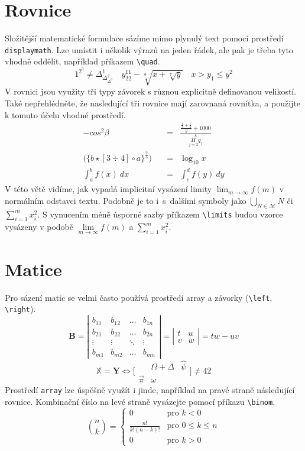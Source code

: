 \documentclass[a4paper, twocolumn, 11pt]{article}
\begin{document}
\section{Rovnice}
Složitější matematické formulace sázíme mimo plynulý text pomocí prostředí \texttt{displaymath}. Lze umístit i několik výrazů na jeden řádek, ale pak je třeba tyto vhodně oddělit, například příkazem \verb|\quad|. 
$$
1^{2^3} \neq \Delta_{\Delta_{\Delta^3}^2}^1 \quad y_{22}^{11}-\sqrt[9]{x+\sqrt[7]{y}} \quad x>y_1\leq y^2
$$
V rovnici jsou využity tři typy závorek s různou explicitně definovanou velikostí. Také nepřehlédněte, že nasledující tři rovnice mají zarovnaná rovnítka, a použijte k tomuto účelu vhodné prostředí. 
\begin{eqnarray}
-cos^2\beta &=& \frac{\frac{\frac{1}{x}+\frac{1}{3}}{y}+1000}{\overset{8}{\underset{j=2}{\Pi}q_j}} \\
\bigg(\Big \{ b \star [3 \div 4 ]\circ a \Big \}^\frac{2}{3} \bigg) \quad &=& \log_{10} x \\
\int_{a}^b f(x)\ dx &=& \int_{c}^d f(y)\ dy
\end{eqnarray}
V této větě vidíme, jak vypadá implicitní vysázení limity $\lim_{m\rightarrow\infty}f(m)$ v normálním odstavci textu. Podobně je to i~s~dalšími symboly jako $\bigcup_{N\in \mathcal{M}} N$ či $\sum_{i=1}^m x_{i}^2$. S vynucením méně úsporné sazby příkazem \verb|\limits| budou vzorce vysázeny v podobě $\lim\limits_{m\rightarrow\infty}f(m)$ a $\sum\limits_{i=1}^m x_{i}^2$.

\section{Matice}
Pro sázení matic se velmi často používá prostředí array a závorky (\verb|\left|, \verb|\right|). 
$$
\mathbf{B}=\left|\begin{array}{cccc}
b_{11} & b_{12} & \dots & b_{1 n} \\
b_{21} & b_{22} & \dots & b_{2 n} \\
\vdots & \vdots & \ddots & \vdots \\
b_{m 1} & b_{m 2} & \dots & b_{m n}
\end{array}\right|=\left|\begin{array}{cc}
t & u \\
v & w
\end{array}\right|=t w-u v
$$
$$
\mathbb X = \mathbf {Y} \Longleftrightarrow \bigg [ \begin{array}{ccc}
     & \Omega +\Delta & \hat{\psi}  \\
  \vec{\pi}   &  \omega
\end{array}\bigg ] \neq 42
$$
Prostředí \texttt{array} lze úspěšně využít i jinde, například na pravé straně následující rovnice. Kombinační číslo na levé straně vysázejte pomocí příkazu \verb|\binom|.
$$
\binom{n}{k}=\left\{\begin{array}{cl}
0 & \text {pro } k < 0 \\
\frac{n !}{k !(n-k) !} & \text {pro } 0 \leq k \leq n \\
0 & \text {pro } k>0 
\end{array}\right.
$$
\label{rovnice}
\end{document}
